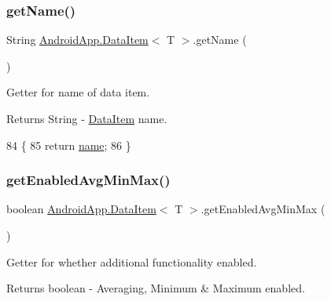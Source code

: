 \subsubsection{\texorpdfstring{get\+Name()}{getName()}}
{\footnotesize\ttfamily String \hyperlink{class_android_app_1_1_data_item}{Android\+App.\+Data\+Item}$<$ T $>$.get\+Name (\begin{DoxyParamCaption}{ }\end{DoxyParamCaption})\hspace{0.3cm}{\ttfamily [inline]}}



Getter for name of data item. 

\begin{DoxyReturn}{Returns}
String -\/ \hyperlink{class_android_app_1_1_data_item}{Data\+Item} name. 
\end{DoxyReturn}

\begin{DoxyCode}
84                             \{
85         \textcolor{keywordflow}{return} \hyperlink{class_android_app_1_1_data_item_a7e6d01c4d449403e707e99fce240b33b}{name};
86     \}
\end{DoxyCode}
\mbox{\label{class_android_app_1_1_data_item_a45f09cabd91cc7032357b02bb0498c3e}} 
\subsubsection{\texorpdfstring{get\+Enabled\+Avg\+Min\+Max()}{getEnabledAvgMinMax()}}
{\footnotesize\ttfamily boolean \hyperlink{class_android_app_1_1_data_item}{Android\+App.\+Data\+Item}$<$ T $>$.get\+Enabled\+Avg\+Min\+Max (\begin{DoxyParamCaption}{ }\end{DoxyParamCaption})\hspace{0.3cm}{\ttfamily [inline]}}



Getter for whether additional functionality enabled. 

\begin{DoxyReturn}{Returns}
boolean -\/ Averaging, Minimum \& Maximum enabled. 
\end{DoxyReturn}

